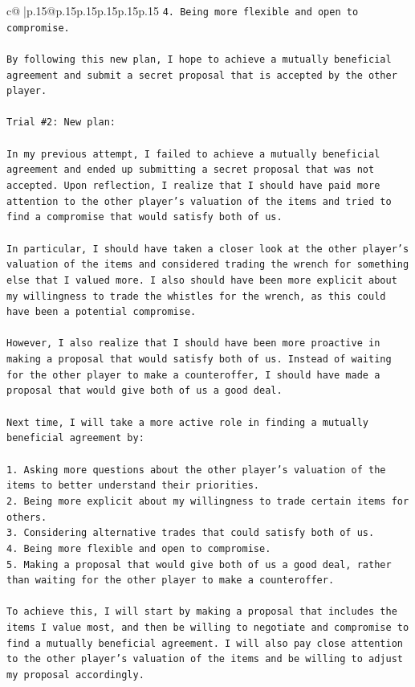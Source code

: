 \documentclass{article}
\begin{document}
{\begin{supertabular}{c@{$\;$}|p{.15\linewidth}@{}p{.15\linewidth}p{.15\linewidth}p{.15\linewidth}p{.15\linewidth}p{.15\linewidth}}
{{{\texttt{4. Being more flexible and open to compromise.} \\
\\ 
\texttt{By following this new plan, I hope to achieve a mutually beneficial agreement and submit a secret proposal that is accepted by the other player.} \\
\\ 
\texttt{Trial \#2: New plan: } \\
\\ 
\texttt{In my previous attempt, I failed to achieve a mutually beneficial agreement and ended up submitting a secret proposal that was not accepted. Upon reflection, I realize that I should have paid more attention to the other player's valuation of the items and tried to find a compromise that would satisfy both of us.} \\
\\ 
\texttt{In particular, I should have taken a closer look at the other player's valuation of the items and considered trading the wrench for something else that I valued more. I also should have been more explicit about my willingness to trade the whistles for the wrench, as this could have been a potential compromise.} \\
\\ 
\texttt{However, I also realize that I should have been more proactive in making a proposal that would satisfy both of us. Instead of waiting for the other player to make a counteroffer, I should have made a proposal that would give both of us a good deal.} \\
\\ 
\texttt{Next time, I will take a more active role in finding a mutually beneficial agreement by:} \\
\\ 
\texttt{1. Asking more questions about the other player's valuation of the items to better understand their priorities.} \\
\texttt{2. Being more explicit about my willingness to trade certain items for others.} \\
\texttt{3. Considering alternative trades that could satisfy both of us.} \\
\texttt{4. Being more flexible and open to compromise.} \\
\texttt{5. Making a proposal that would give both of us a good deal, rather than waiting for the other player to make a counteroffer.} \\
\\ 
\texttt{To achieve this, I will start by making a proposal that includes the items I value most, and then be willing to negotiate and compromise to find a mutually beneficial agreement. I will also pay close attention to the other player's valuation of the items and be willing to adjust my proposal accordingly.} \\
}}}
\end{supertabular}}
\end{document}
